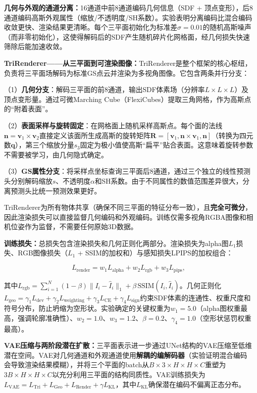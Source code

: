 \textbf{几何与外观的通道分离：}16通道中前8通道编码几何信息（SDF + 顶点变形），后8通道编码高斯外观属性（缩放/不透明度/SH系数）。实验表明分离编码比混合编码收敛更快、渲染结果更清晰。每个三平面初始化为标准差$\sigma=0.01$的随机高斯噪声（而非零初始化），这使得解码后的SDF产生随机碎片化网格面，经几何损失快速筛除后能加速收敛。

\textbf{TriRenderer——从三平面到可渲染图像：}TriRenderer是整个框架的核心枢纽，负责将三平面场解码为标准GS点云并渲染为多视角图像。它包含两条并行分支：

（1）\textbf{几何分支}：解码三平面的前8通道，输出SDF体素场（分辨率$L\times L\times L$）及顶点变形量。通过可微Marching Cube（FlexiCubes）提取三角网格，作为高斯点的``附着表面''。

（2）\textbf{表面采样与旋转固定}：在网格面上随机采样高斯点。每个面的法线$\mathbf{n}=\mathbf{v}_1\times\mathbf{v}_2$直接定义该面所生成高斯的旋转矩阵$\mathbf{R}=[\mathbf{v}_1, \mathbf{n}\times\mathbf{v}_1, \mathbf{n}]$（转换为四元数$\mathbf{q}$），第三个缩放分量$s_3$固定为极小值使高斯``扁平''贴合表面。这意味着旋转参数不需要被学习，由几何隐式确定。

（3）\textbf{GS属性分支}：将采样点坐标查询三平面后8通道，通过三个独立的线性预测头分别解码缩放$s$、不透明度$\alpha$和SH系数。由于不同属性的数值范围差异很大，分离预测头比统一预测效果更好。

TriRenderer为所有物体共享（确保不同三平面的特征分布一致），且\textbf{完全可微分}，因此渲染损失可以直接监督几何编码和外观编码。训练仅需多视角RGBA图像和相机位姿作为监督，不需要任何原始3D数据。

\textbf{训练损失：}总损失包含渲染损失和几何正则化两部分。渲染损失为alpha图$L_1$损失、RGB图像损失（$L_1$ + SSIM的加权和）与感知损失LPIPS的加权组合：

\begin{equation}
L_\text{render} = w_1 L_\text{alpha} + w_2 L_\text{rgb} + w_3 L_\text{pips},
\end{equation}

其中$L_\text{rgb} = \sum_{i=1}^N(1-\beta)\|I_i-\hat{I}_i\|_1 + \beta\,\text{SSIM}(I_i, \hat{I}_i)$。几何正则化$L_\text{geo} = \gamma_1 L_\text{dev} + \gamma_2 L_\text{weighting} + \gamma_3 L_\text{CE} + \gamma_4 L_\text{sign}$约束SDF体素的连通性、权重尺度和符号分布，防止坍缩为空形状。实验确定的关键权重为$w_1=5.0$（alpha图权重最高，强调轮廓准确性）、$w_2=1.0$、$w_3=1.2$、$\beta=0.2$、$\gamma_4=1.0$（空形状惩罚权重最高）。

\textbf{VAE压缩与两阶段潜在扩散：}三平面表示进一步通过UNet结构的VAE压缩至低维潜在空间。VAE对几何通道和外观通道使用\textbf{解耦的编解码器}（实验证明混合编码会导致渲染结果模糊），并将三个平面的batch从$B\times 3\times H\times H\times C$重塑为$3B\times H\times H\times C$以充分利用三平面的结构同质性。VAE训练损失为$L_\text{VAE} = L_\text{Tri} + L_\text{Geo} + L_\text{Render} + \gamma L_\text{KL}$，其中$L_\text{KL}$确保潜在编码不偏离正态分布。

